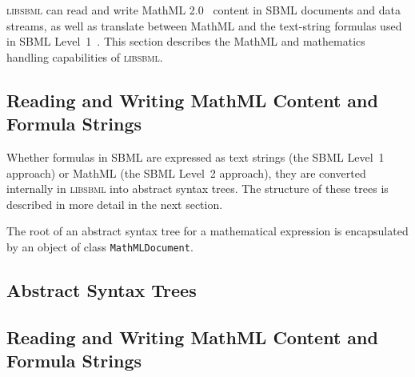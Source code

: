 \documentclass{cekmanual}
\newcommand{\libsbml}{\textsc{libsbml}}
\begin{document}
\libsbml{} can read and write MathML 2.0~\citep{w3c:2000b} content in SBML
documents and data streams, as well as translate between MathML and the
text-string formulas used in SBML Level~1~\citep{hucka:2001,hucka:2003}.
This section describes the MathML and mathematics handling capabilities of
\libsbml{}.


\subsection{Reading and Writing MathML Content and Formula Strings}
\label{sec:reading-writing-mathml}

Whether formulas in SBML are expressed as text strings (the SBML Level~1
approach) or MathML (the SBML Level~2 approach), they are converted
internally in \libsbml{} into abstract syntax trees.  The structure of
these trees is described in more detail in the next section.

The root of an abstract syntax tree for a mathematical expression is
encapsulated by an object of class \texttt{MathMLDocument}.  



\subsection{Abstract Syntax Trees}
\label{sec:ast}


\subsection{Reading and Writing MathML Content and Formula Strings}
\label{sec:reading-writing-mathml}










\end{document}
